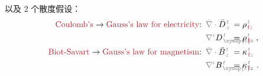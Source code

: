 以及 2 个散度假设：
\begin{subequations} \label{eq:Div-DB}
\begin{align}
	\textcolor{Maroon}{\text{Coulomb's}} \to \textcolor{Maroon}{\text{Gauss's law for electricity}}\text{:}&\hspace{0.5em} \mathcolor{gray}{\bar{\nabla} \cdot} \bar{D}^{\;\!\mathcolor{gray}{t}}_{\;\!\mathcolor{gray}{z}} \hspace{-3.8em} &&= {\rho}^{\;\!\mathcolor{gray}{t}}_{\;\!\textcolor{Maroon}{\text{f}}\mathcolor{gray}{z}} \label{eq:Div-D} \\ 
	&\hspace{0.5em} \mathcolor{gray}{\nabla^\iota} D^{\;\!\mathcolor{gray}{t}}_{\;\! \mathcolor{gray}{\symup{\iota}}\mathcolor{gray}{z}} \hspace{-3.8em} &&= {\rho}^{\;\!\mathcolor{gray}{t}}_{\;\!\textcolor{Maroon}{\text{f}}\mathcolor{gray}{z}}~, \label{eq:div-D} \\
	\textcolor{Maroon}{\text{Biot-Savart}} \to \textcolor{Maroon}{\text{Gauss's law for magnetism}}\text{:}&\hspace{0.5em} \mathcolor{gray}{\bar{\nabla} \cdot} \bar{B}^{\;\!\mathcolor{gray}{t}}_{\;\!\mathcolor{gray}{z}} \hspace{-3.8em} &&= {\kappa}^{\;\!\mathcolor{gray}{t}}_{\;\!\textcolor{Maroon}{\text{f}}\mathcolor{gray}{z}} \label{eq:Div-Bk} \\
	&\hspace{0.5em} \mathcolor{gray}{\nabla^\iota} B^{\;\!\mathcolor{gray}{t}}_{\;\! \mathcolor{gray}{\symup{\iota}}\mathcolor{gray}{z}} \hspace{-3.8em} &&= {\kappa}^{\;\!\mathcolor{gray}{t}}_{\;\!\textcolor{Maroon}{\text{f}}\mathcolor{gray}{z}}~. \label{eq:div-Bk}
\end{align}
\end{subequations}
